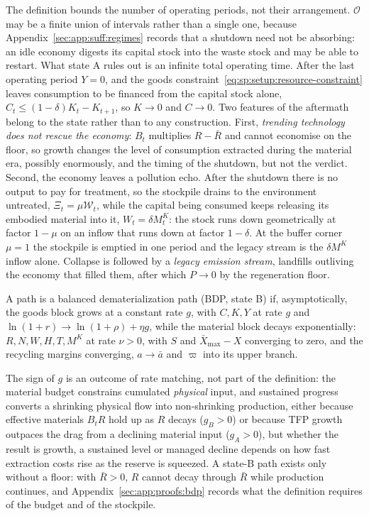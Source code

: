 The definition bounds the number of operating periods, not their arrangement. $\mathcal O$ may be a finite union of intervals rather than a single one, because Appendix~\ref{sec:app:suff:regimes} records that a shutdown need not be absorbing: an idle economy digests its capital stock into the waste stock and may be able to restart. What state A rules out is an infinite total operating time. After the last operating period $Y=0$, and the goods constraint~\eqref{eq:sp:setup:resource-constraint} leaves consumption to be financed from the capital stock alone, $C_t\le\left(1-\delta\right)K_t-K_{t+1}$, so $K\to0$ and $C\to0$. Two features of the aftermath belong to the state rather than to any construction. First, \emph{trending technology does not rescue the economy}: $B_t$ multiplies $R-\bar R$ and cannot economise on the floor, so growth changes the level of consumption extracted during the material era, possibly enormously, and the timing of the shutdown, but not the verdict. Second, the economy leaves a pollution echo. After the shutdown there is no output to pay for treatment, so the stockpile drains to the environment untreated, $\Xi_t=\mu\mathcal W_t$, while the capital being consumed keeps releasing its embodied material into it, $W_t=\delta M^K_t$: the stock runs down geometrically at factor $1-\mu$ on an inflow that runs down at factor $1-\delta$. At the buffer corner $\mu=1$ the stockpile is emptied in one period and the legacy stream is the $\delta M^K$ inflow alone. Collapse is followed by a \emph{legacy emission stream}, landfills outliving the economy that filled them, after which $P\to0$ by the regeneration floor.

\begin{definition}\label{def:lr:bdp}
A path is a balanced dematerialization path (BDP, state B) if, asymptotically, the goods block grows at a constant rate $g$, with $C,K,Y$ at rate $g$ and $\ln\left(1+r\right)\to\ln\left(1+\rho\right)+\eta g$, while the material block decays exponentially: $R,N,W,H,T,M^K$ at rate $\nu>0$, with $S$ and $\bar X_{\max}-X$ converging to zero, and the recycling margins converging, $a\to\bar a$ and $\varpi$ into its upper branch.
\end{definition}

The sign of $g$ is an outcome of rate matching, not part of the definition: the material budget constrains cumulated \emph{physical} input, and sustained progress converts a shrinking physical flow into non-shrinking production, either because effective materials $B_tR$ hold up as $R$ decays ($g_B>0$) or because TFP growth outpaces the drag from a declining material input ($g_A>0$), but whether the result is growth, a sustained level or managed decline depends on how fast extraction costs rise as the reserve is squeezed. A state-B path exists only without a floor: with $\bar R>0$, $R$ cannot decay through $\bar R$ while production continues, and Appendix~\ref{sec:app:proofs:bdp} records what the definition requires of the budget and of the stockpile.

